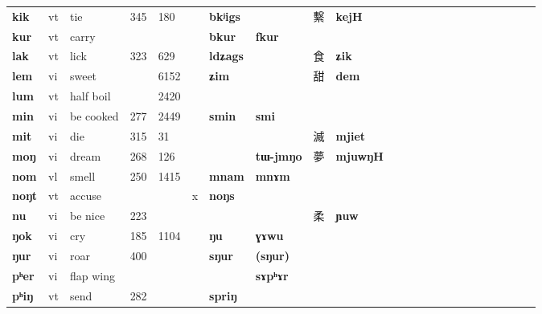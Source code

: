 \documentclass[oldfontcommands,oneside,a4paper,11pt]{article}
\newcommand{\ipa}[1]{{\phon\textbf{#1}}}
\newcommand{\zh}[1]{{\cn #1}}
\begin{document}
\begin{table}[h]
{\begin{tabular}{lllllllllllllllllllllll}
\ipa{kik}   &  	vt   &  	tie   &  	\tiny 345   &  	\tiny 180   &  	   &  	\ipa{bkʲigs}   &  	\ipa{}   &  	\zh{繫}   &  	\ipa{kejH}   \\  		
\ipa{kur}   &  	vt   &  	carry   &  	\tiny    &  	\tiny    &  	   &  	\ipa{bkur}   &  	\ipa{fkur}   &  	\zh{}   &  	\ipa{}   \\  		
\ipa{lak}   &  	vt   &  	lick   &  	\tiny 323   &  	\tiny 629   &  	   &  	\ipa{ldʑags}   &  	\ipa{}   &  	\zh{食}   &  	\ipa{ʑik}   \\  	
\ipa{lem}   &  	vi   &  	sweet   &  	\tiny    &  	\tiny   6152	   &    &  	\ipa{ʑim}   &  	\ipa{}   &  	\zh{甜}   &  	\ipa{dem}   \\  			
\ipa{lum}   &  	vt   &  	half boil   &  	\tiny    &  	\tiny 2420   &  	   &  	\ipa{}   &  	\ipa{}   &  	\zh{}   &  	\ipa{}   \\  		
\ipa{min}   &  	vi   &  	be cooked   &  	\tiny 277   &  	\tiny 2449   &  	   &  	\ipa{smin}   &  	\ipa{smi}   &  	\zh{}   &  	\ipa{}   \\  		
\ipa{mit}   &  	vi   &  	die   &  	\tiny 315   &  	\tiny 31   &  	   &  	\ipa{}   &  	\ipa{}   &  	\zh{滅}   &  	\ipa{mjiet}   \\  		
\ipa{moŋ}   &  	vi   &  	dream   &  	\tiny 268   &  	\tiny 126   &  	   &  	\ipa{}   &  	\ipa{tɯ-jmŋo}   &  	\zh{夢}   &  	\ipa{mjuwŋH}   \\  		
\ipa{nom}   &  	vl   &  	smell   &  	\tiny 250   &  	\tiny 1415   &  	   &  	\ipa{mnam}   &  	\ipa{mnɤm}   &  	\zh{}   &  	\ipa{}   \\  		
\ipa{noŋt}   &  	vt   &  	accuse   &  	\tiny    &  	\tiny    &  	x   &  	\ipa{noŋs }   &  	\ipa{}   &  	\zh{}   &  	\ipa{}   \\  		
\ipa{nu}   &  	vi   &  	be nice   &  	\tiny 223   &  	\tiny    &  	   &  	\ipa{}   &  	\ipa{}   &  	\zh{柔}   &  	\ipa{ɲuw}   \\  		
\ipa{ŋok}   &  	vi   &  	cry   &  	\tiny 185   &  	\tiny 1104   &  	   &  	\ipa{ŋu}   &  	\ipa{ɣɤwu}   &  	\zh{}   &  	\ipa{}   \\  		
\ipa{ŋur}   &  	vi   &  	roar   &  	\tiny 400   &  	\tiny    &  	   &  	\ipa{sŋur}   &  	\ipa{(sŋur)}   &  	\zh{}   &  	\ipa{}   \\  		
\ipa{pʰer}   &  	vi   &  	flap wing   &  	\tiny    &  	\tiny    &  	   &  	\ipa{}   &  	\ipa{sɤpʰɤr}   &  	\zh{}   &  	\ipa{}   \\  		
\ipa{pʰiŋ}   &  	vt   &  	send   &  	\tiny 282   &  	\tiny    &  	   &  	\ipa{spriŋ}   &  	\ipa{}   &  	\zh{}   &  	\ipa{}   \\  		

\end{tabular}}
\end{table}
\end{document}
